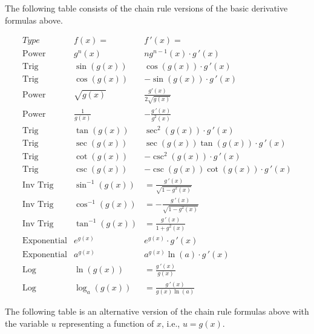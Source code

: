\documentclass[handout]{ximera}
\begin{document}
The following table consists of the chain rule versions of the basic derivative formulas above.

\begin{center}
\[
\begin{array}{c|c|c}
		Type & f(x)= & f\,'(x)=  \\
		\hline
		\text{Power} & g^n(x) & ng^{n-1}(x)\cdot g\,'(x)  \\[8pt]
		\hline
		\text{Trig} & \sin\left(g(x)\right) & \cos\left(g(x)\right) \cdot g\,'(x) \\[8pt]
		\text{Trig} & \cos\left(g(x)\right) & -\sin\left(g(x)\right)\cdot g\,'(x)  \\[8pt]
		\hline
		\text{Power} & \sqrt{g(x)} & \displaystyle \frac{g'(x)}{2\sqrt {g(x)}}\\[8pt]
		\text{Power} & \displaystyle \frac{1}{g(x)} & -\displaystyle \frac{g\,'(x)}{g^2(x)}\\[8pt]
	  \hline
	  \text{Trig} & \tan\left(g(x)\right) & \sec^2\left(g(x)\right) \cdot g\,'(x) \\[8pt]
		\text{Trig} & \sec\left(g(x)\right) & \sec\left(g(x)\right)\tan\left(g(x)\right) \cdot g\,'(x) \\[8pt]
		\hline
		\text{Trig} & \cot\left(g(x)\right) & -\csc^2\left(g(x)\right) \cdot g\,'(x)  \\[8pt]
		\text{Trig} & \csc\left(g(x)\right) & -\csc\left(g(x)\right)\cot\left(g(x)\right) \cdot g\,'(x)  \\[8pt]
		\hline
		\text{Inv Trig} & \sin^{-1}\left(g(x)\right) &  = \frac{g\,'(x)}{\sqrt{1-g^2(x)}}  \\[8pt]
		\text{Inv Trig} & \cos^{-1}\left(g(x)\right) &  = -\frac{g\,'(x)}{\sqrt{1-g^2(x)}}\\[8pt]
		\text{Inv Trig} & \tan^{-1}\left(g(x)\right) &  = \frac{g\,'(x)}{1+g^2(x)} \\[8pt]
		\hline
		\text{Exponential} & e^{g(x)} & e^{g(x)} \cdot g\,'(x) \\[8pt]
		\text{Exponential} & a^{g(x)} & a^{g(x)}\ln(a) \cdot g\,'(x) \\[8pt]
		\hline
		\text{Log} & \ln\left(g(x)\right) &  = \frac{g\,'(x)}{g(x)} \\[8pt]
		\text{Log} & \log_a\left(g(x)\right) &  = \frac{g\,'(x)}{g(x)\ln(a)}
	\end{array}
    \]
\end{center}


The following table is an alternative version of the chain rule formulas above 
with the variable $u$ representing a function of $x$, i.e., $u = g(x)$.
\end{document}
